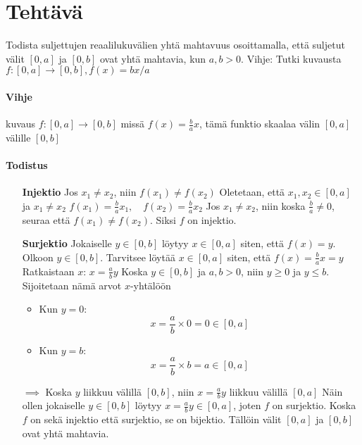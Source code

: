\documentclass{article}
\newcounter{tehtava}
\begin{document}
\newpage
{}
\section*{Tehtävä \thetehtava}
Todista suljettujen reaalilukuvälien yhtä mahtavuus osoittamalla, että suljetut välit $[0, a]$ ja
$[0, b]$ ovat yhtä mahtavia, kun $a, b > 0$. Vihje: Tutki kuvausta $f : [0, a] \rightarrow [0, b], f(x) = bx/a$
\newline
\paragraph*{Vihje}
kuvaus $f : [0, a] \rightarrow [0, b]$ missä $f(x) = \frac{b}{a}x$, tämä funktio skaalaa välin $[0, a]$ välille $[0, b]$

\paragraph*{Todistus}
\begin{itemize}
    \item[\textbf{Injektio}] Jos $x_1 \neq x_2$, niin $f(x_1) \neq f(x_2)$\newline
    Oletetaan, että $x_1, x_2 \in [0, a]$ ja $x_1 \neq x_2$\newline
    $f(x_1) = \frac{b}{a}x_1, \quad f(x_2) = \frac{b}{a}x_2$\newline
    Jos $x_1 \neq x_2$, niin koska $\frac{b}{a} \neq 0$, seuraa että $f(x_1) \neq f(x_2)$. Siksi $f$ on injektio.
    \item[\textbf{Surjektio}] Jokaiselle $y \in [0, b]$ löytyy $x \in [0, a]$ siten, että $f(x) = y$.\newline
    Olkoon $y \in [0, b]$. Tarvitsee löytää $x \in [0, a]$ siten, että\newline
    $f(x) = \frac{b}{a}x = y$\newline
    \newline
    Ratkaistaan $x$:\newline
    $x = \frac{a}{b}y$\newline
    Koska $y \in [0, b]$ ja $a, b > 0$, niin $y \geq 0$ ja $y \leq b$. Sijoitetaan nämä arvot $x$-yhtälöön
    \begin{itemize}
        \item Kun $y = 0$:
        \[
        x = \frac{a}{b} \times 0 = 0 \in [0, a]
        \]
        \item Kun $y = b$:
        \[
        x = \frac{a}{b} \times b = a \in [0, a]
        \]
    \end{itemize}
    $\implies$ Koska $y$ liikkuu välillä $[0, b]$, niin $x = \frac{a}{b}y$ liikkuu välillä $[0, a]$\newline
    Näin ollen jokaiselle  $y \in [0, b]$ löytyy $x = \frac{a}{b}y \in [0, a]$, joten $f$ on surjektio.\newline
    \newline
    Koska $f$ on sekä injektio että surjektio, se on bijektio. Tällöin välit $[0, a]$ ja $[0, b]$ ovat yhtä mahtavia.
\end{itemize}
\end{document}
